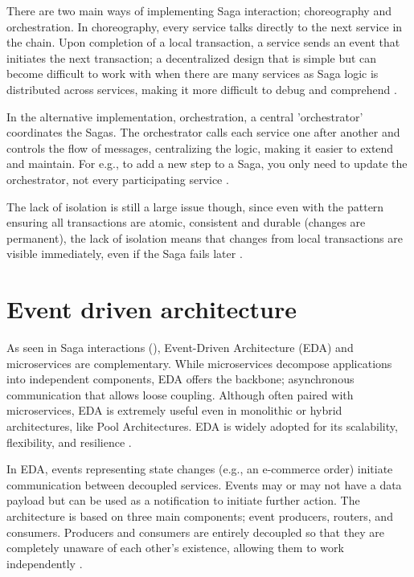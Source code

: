 \documentclass[]{final}
\begin{document}
There are two main ways of implementing Saga interaction; choreography and
orchestration. In choreography, every service talks directly to the next
service in the chain. Upon completion of a local transaction, a service sends
an event that initiates the next transaction; a decentralized design that is
simple but can become difficult to work with when there are many services
as Saga logic is distributed across services, making it more difficult
to debug and comprehend \cite{noauthor_saga_nodate}.

In the alternative implementation, orchestration, a central ’orchestrator’
coordinates the Sagas. The orchestrator calls each service one after another
and controls the flow of messages, centralizing the logic, making it easier
to extend and maintain. For e.g., to add a new step to a Saga, you only need
to update the orchestrator, not every participating service \cite{noauthor_saga_nodate}.

The lack of isolation is still a large issue though, since even with the
pattern ensuring all transactions are atomic, consistent and durable
(changes are permanent), the lack of isolation means that changes from local
transactions are visible immediately, even if the Saga fails later \cite{noauthor_saga_nodate}.

\section{Event driven architecture}

As seen in Saga interactions {\hypersetup{linkcolor=teal}(\pageref{saga_events})},
Event-Driven Architecture (EDA) and microservices are complementary. While
microservices decompose applications into independent components, EDA offers
the backbone; asynchronous communication that allows loose coupling. Although
often paired with microservices, EDA is extremely useful even in monolithic or
hybrid architectures, like Pool Architectures. EDA is widely adopted for its
scalability, flexibility, and resilience \cite{noauthor_event-driven_nodate}.

In EDA, events representing state changes (e.g., an e-commerce order) initiate
communication between decoupled services. Events may or may not have a data
payload but can be used as a notification to initiate further action. The
architecture is based on three main components; event producers, routers, and
consumers. Producers and consumers are entirely decoupled so that they are
completely unaware of each other’s existence, allowing them to work
independently \cite{noauthor_event-driven_nodate}.
\end{document}
